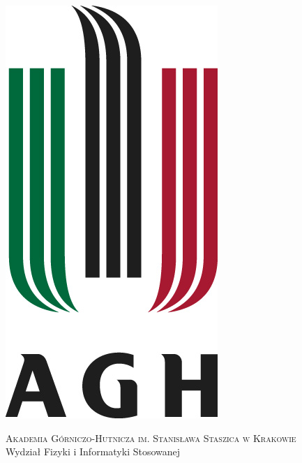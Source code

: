 \documentclass[a4paper,12pt,table]{article}
\begin{document}

\begin{titlepage}

\newcommand{\HRule}{\rule{\linewidth}{0.5mm}} %

\center %
 
\begin{minipage}{0.17\textwidth}
\bigskip
\includegraphics[scale=0.4]{agh}\newline
\bigskip
\end{minipage}\hfill
\begin{minipage}{0.83\textwidth}
\bigskip
\bigskip
\bigskip
\bigskip
\bigskip
\bigskip
\bigskip
\bigskip
\bigskip
\bigskip
\bigskip
\textsc{\small Akademia Górniczo-Hutnicza im. Stanisława Staszica w Krakowie}\\[0.2 cm] %
{\Large Wydział Fizyki i Informatyki Stosowanej}\\
\end{minipage}
\vspace*{0mm}


\end{titlepage}
\end{document}

